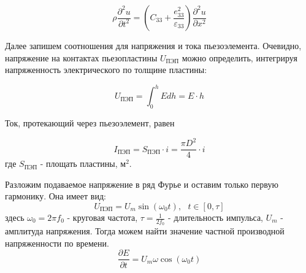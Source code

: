 \documentclass[a4paper, 12pt]{article}
\begin{document}
\begin{equation}
	\rho \frac{\partial^2 u}{\partial t^2} = \left( C_{33} + \frac{e_{33}^2}{\varepsilon_{33}} \right)\frac{\partial^2 u}{\partial x^2}
\end{equation}

Далее запишем соотношения для напряжения и тока пьезоэлемента. Очевидно, напряжение на контактах пьезопластины $U_\text{ПЭП}$ можно определить, интегрируя напряженность электрического по толщине пластины:

\begin{equation}
	U_\text{ПЭП} = \int_{0}^{h}{E dh} = E\cdot h
\end{equation}

Ток, протекающий через пьезоэлемент, равен	

\begin{equation}
 I_\text{ПЭП} = S_\text{ПЭП} \cdot i = \frac{\pi D^2}{4} \cdot i
\end{equation}
где $S_\text{ПЭП}$ - площать пластины, м$^2$.

Разложим подаваемое напряжение в ряд Фурье и оставим только первую гармонику. Она имеет вид: 
\begin{equation}
	U_\text{ПЭП} = U_m \sin{(\omega_0 t)}, \text{    } t \in [0, \tau]
\end{equation}
здесь $\omega_0 = 2 \pi f_0$ - круговая частота, $\tau = \displaystyle\frac{1}{2f_0}$ - длительность импульса, $U_m$ - амплитуда напряжения. Тогда можем найти значение частной производной напряженности по времени.
\begin{equation}
	\frac{\partial E}{\partial t} = U_m \omega \cos{(\omega_0 t)}
\end{equation}
\end{document}
